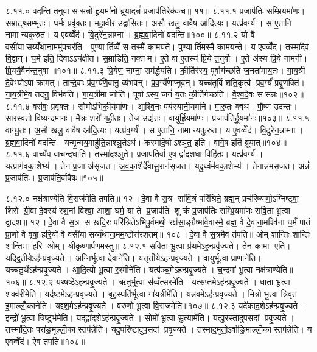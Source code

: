 ८.११.०
व॒द॒न्ति॒ त॒नुवा॒ सस॑न्नो हू॒यमा॑नो ब्रूया॒दन्नं॑ प्र॒जाप॑ति॒रेक॑ञ्च॥ ११॥
८.११.१
प्र॒जाप॑तिः सम्भ्रि॒यमा॑णः। स॒म्राट्थ्सम्भृ॑तः। घ॒र्मः प्रवृ॑क्तः। म॒हा॒वी॒र उद्वा॑सितः। अ॒सौ खलु॒ वावैष आ॑दि॒त्यः। यत्प्र॑व॒र्ग्य॑। स ए॒तानि॒ नामान्यकुरुत। य ए॒वव्वेँद॑। वि॒दुरे॑न॒न्नाम्ना। ब्र॒ह्म॒वा॒दिनो॑ वदन्ति॥१००॥
८.११.२
यो वै वसी॑यासय्यँथाना॒ममु॑प॒चर॑ति। पुण्यार्ति॒व्वैँ स तस्मै॑ कामयते। पुण्यार्तिमस्मै कामयन्ते। य ए॒वव्वेँद॑। तस्मा॑दे॒वं  वि॒द्वान्। घ॒र्म इति॒ दिवाऽऽच॑क्षीत। स॒म्राडिति॒ नक्तम्। ए॒ते वा ए॒तस्य॑ प्रि॒ये त॒नुवौ। ए॒ते अ॑स्य प्रि॒ये नाम॑नी। प्रि॒ययै॒वैन॑न्त॒नुवा॥१०१॥
८.११.३
प्रि॒येण॒ नाम्ना॒ सम॑र्द्धयति। की॒र्तिर॑स्य॒ पूर्वाग॑च्छति ज॒नता॑माय॒तः। गा॒य॒त्री दे॒वेभ्योऽपाक्रामत्। तान्दे॒वाः प्र॑व॒र्ग्ये॑णै॒वानु॒ व्य॑भवन्। प्र॒व॒र्ग्ये॑णाप्नुवन्। यच्च॑तुर्विशति॒कृत्व॑ प्रव॒र्ग्यं॑ प्रवृ॒णक्ति॑। गा॒य॒त्रीमे॒व तदनु॒ विभ॑वति। गा॒य॒त्रीमाप्नोति। पूर्वाऽस्य॒ जनं॑ य॒तः की॒र्तिर्ग॑च्छति। वै॒श्व॒दे॒वः सस॑न्नः॥१०२॥
८.११.४
वस॑वः॒ प्रवृ॑क्तः। सोमो॑ऽभिकी॒र्यमा॑णः। आ॒श्वि॒नः पय॑स्यानी॒यमा॑ने। मा॒रु॒तः क्वथ\sn{}। पौ॒ष्ण उद॑न्तः। सा॒र॒स्व॒तो वि॒ष्यन्द॑मानः। मै॒त्रः  शरो॑ गृही॒तः। तेज॒ उद्य॑तः। वा॒युर्ह्रि॒यमा॑णः। प्र॒जाप॑तिर्\mbox{}हू॒यमा॑नः॥१०३॥
८.११.५
वाग्घु॒तः। अ॒सौ खलु॒ वावैष आ॑दि॒त्यः। यत्प्र॑व॒र्ग्य॑। स ए॒तानि॒ नामान्यकुरुत। य ए॒वव्वेँद॑। वि॒दुरे॑न॒न्नाम्ना। ब्र॒ह्म॒वा॒दिनो॑ वदन्ति। यन्मृ॒न्मय॒माहु॑ति॒न्नाश्ञु॒तेऽथ॑। कस्मा॑दे॒षोऽश्ञुत॒ इति॑। वागे॒ष इति॑ ब्रूयात्॥१०४॥
८.११.६
वा॒च्ये॑व वाच॑न्दधाति। तस्मा॑दश्ञुते। प्र॒जाप॑ति॒र्वा ए॒ष द्वा॑दश॒धा विहि॑तः। यत्प्र॑व॒र्ग्य॑। यत्प्राग॑वका॒शेभ्य॑। तेन॑ प्र॒जा अ॑सृजत। अ॒व॒का॒शैर्दे॑वासु॒रान॑सृजत। यदू॒र्ध्वम॑वका॒शेभ्य॑। तेनान्न॑मसृजत। अन्नं॑ प्र॒जाप॑तिः। प्र॒जाप॑ति॒र्वावैषः॥१०५॥
\anuvakamend

८.१२.०
नक्ष॑त्राण्येति वि॒राज॑मेति तपति॥ १२॥ दे॒वा वै स॒त्र सा॑वि॒त्रं परि॑श्रिते॒ ब्रह्म॒न् प्रच॑रिष्यामो॒ऽग्निष्ट्वा॒ शिरो ग्री॒वा दे॒वस्य॑ रश॒नां  विश्वा॒ आशा॒ घर्म॒ या ते प्र॒जाप॑ति शुक्रं प्र॒जाप॑तिः सम्भ्रि॒यमा॑णः सवि॒ता भू॒त्वा द्वाद॑श॥ १२॥ दे॒वा वै स॒त्र स ख॑दि॒रः परि॑श्रितेऽभिपू॒र्वमथो॒ रक्ष॑सा॒ङ्ग्रैष्मा॑वे॒वास्मै॒ ब्रह्म॒ वै दे॒वाना॒मश्वि॑ना घ॒र्मं पा॑तं प्रा॒णो वै वृषा॒ हरि॒र्यो वै वसी॑यासय्यँथाना॒मम॒ष्टोत्त॑रशतम्॥ १०८॥ दे॒वा वै स॒त्रमैव त॑पति॥ ओम् शान्तिः  शान्तिः  शान्तिः॥ हरि॑ ओम्। श्रीकृष्णार्पणमस्तु॥
८.१२.१
स॒वि॒ता भू॒त्वा प्र॑थ॒मेऽह॒न्प्रवृ॑ज्यते। तेन॒ कामा एति। यद्द्वि॒तीयेऽह॑न्प्रवृ॒ज्यते। अ॒ग्निर्भू॒त्वा दे॒वाने॑ति। यत्तृ॒तीयेऽह॑न्प्रवृ॒ज्यते। वा॒युर्भू॒त्वा प्रा॒णाने॑ति। यच्च॑तु॒र्थेऽह॑न्प्रवृ॒ज्यते। आ॒दि॒त्यो भू॒त्वा र॒श्मीने॑ति। यत्प॑ञ्च॒मेऽह॑न्प्रवृ॒ज्यते। च॒न्द्रमा॑ भू॒त्वा नक्ष॑त्राण्येति॥१०६॥
८.१२.२
यथ्ष॒ष्ठेऽह॑न्प्रवृ॒ज्यते। ऋ॒तुर्भू॒त्वा स॑व्वँत्स॒रमे॑ति। यत्स॑प्त॒मेऽह॑न्प्रवृ॒ज्यते। धा॒ता भू॒त्वा शक्व॑रीमेति। यद॑ष्ट॒मेऽह॑न्प्रवृ॒ज्यते। बृह॒स्पति॑र्भू॒त्वा गा॑य॒त्रीमे॑ति। यन्न॑व॒मेऽह॑न्प्रवृ॒ज्यते। मि॒त्रो भू॒त्वा त्रि॒वृत॑ इ॒माल्लोँ॒काने॑ति। यद्द॑श॒मेऽह॑न्प्रवृ॒ज्यते। वरु॑णो भू॒त्वा वि॒राज॑मेति॥१०७॥
८.१२.३
यदे॑काद॒शेऽह॑न्प्रवृ॒ज्यते। इन्द्रो॑ भू॒त्वा त्रि॒ष्टुभ॑मेति। यद्द्वा॑द॒शेऽह॑न्प्रवृ॒ज्यते। सोमो॑ भू॒त्वा सु॒त्यामे॑ति। यत्पु॒रस्ता॑दुप॒सदां प्रवृ॒ज्यते। तस्मा॑दि॒तः परा॑ङ॒मूल्लोँ॒कास्तप॑न्नेति। यदु॒परि॑ष्टादुप॒सदां प्रवृ॒ज्यते। तस्मा॑द॒मुतो॒ऽर्वाङि॒माल्लोँ॒कास्तप॑न्नेति। य ए॒वव्वेँद॑। ऐव त॑पति॥१०८॥

